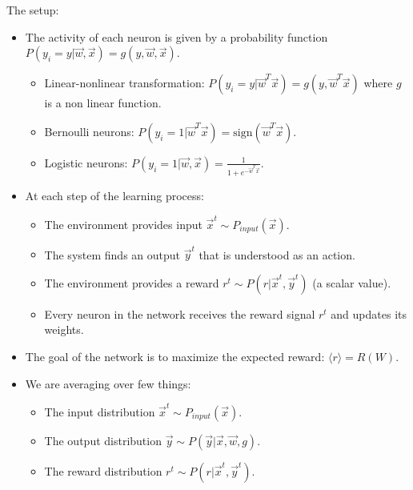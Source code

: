 \documentclass[11pt]{book} %
\begin{document}
The setup: 
\begin{itemize}
    \item The activity of each neuron is given by a probability function $P(y_i = y | \vec{w}, \vec{x}) = g(y, \vec{w}, \vec{x})$. 
        \begin{itemize}
            \item Linear-nonlinear transformation: $P(y_i = y | \vec{w}^T \vec{x}) = g(y, \vec{w}^T\vec{x})$ where $g$ is a non linear function.
            \item Bernoulli neurons: $P(y_i = 1 | \vec{w}^T \vec{x}) =  \text{sign}(\vec{w}^T \vec{x})$.
            \item Logistic neurons: $P(y_i = 1 | \vec{w}, \vec{x}) = \frac{1}{1 + e^{-\vec{w}^T \vec{x}}}$.
        \end{itemize}
    \item At each step of the learning process:
    \begin{itemize}
        \item The environment provides input $\vec{x}^t \sim P_{input}(\vec{x})$.
        \item The system finds an output $\vec{y}^t$ that is understood as an action.
        \item The environment provides a reward $r^t \sim P(r | \vec{x}^t, \vec{y}^t)$ (a scalar value).
        \item Every neuron in the network receives the reward signal $r^t$ and updates its weights.
    \end{itemize}
    \item The goal of the network is to maximize the expected reward: $\langle r \rangle = R(W)$.
    \item We are averaging over few things:
    \begin{itemize}
        \item The input distribution $\vec{x}^t \sim P_{input}(\vec{x})$.
        \item The output distribution $\vec{y} \sim P(\vec{y} | \vec{x}, \vec{w}, g)$.
        \item The reward distribution $r^t \sim P(r | \vec{x}^t, \vec{y}^t)$.
    \end{itemize}
\end{itemize}
\end{document}
